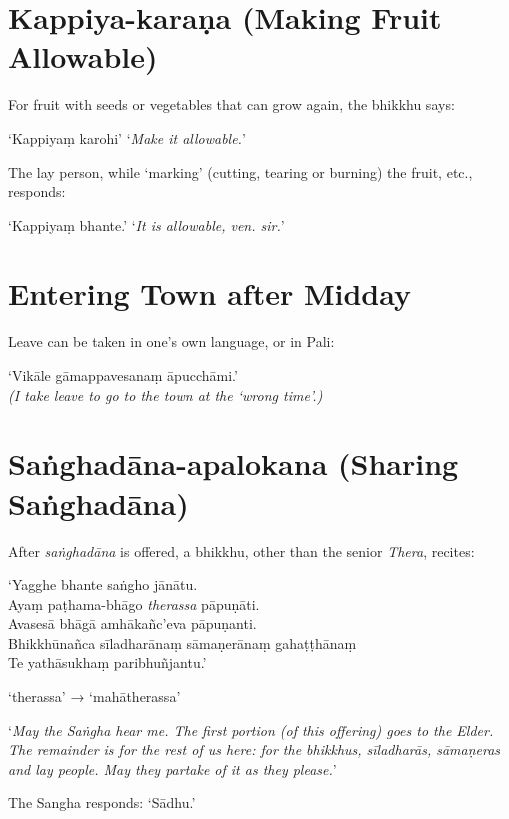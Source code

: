 \section{Kappiya-karaṇa (Making Fruit Allowable)}

For fruit with seeds or vegetables that can grow again, the bhikkhu says:

‘Kappiyaṃ karohi’ ‘\emph{Make it allowable.}’

The lay person, while ‘marking’ (cutting, tearing or burning) the fruit, etc., responds:

‘Kappiyaṃ bhante.’ ‘\emph{It is allowable, ven. sir.}’ 

\section{Entering Town after Midday}

Leave can be taken in one's own language, or in Pali:

‘Vikāle gāmappavesanaṃ āpucchāmi.’\\
\emph{(I take leave to go to the town at the ‘wrong time’.)} 

\section{Saṅghadāna-apalokana (Sharing Saṅghadāna)}

\ifreferenceedition
\enlargethispage{\baselineskip}
\fi

After \emph{saṅghadāna} is offered, a bhikkhu, other than the senior
\emph{Thera}, recites:

\vspace*{\parskip}

‘Yagghe bhante saṅgho jānātu.\\
Ayaṃ paṭhama-bhāgo \emph{therassa} pāpuṇāti.\\
Avasesā bhāgā amhākañc’eva pāpuṇanti.\\
Bhikkhūnañca sīladharānaṃ sāmaṇerānaṃ gahaṭṭhānaṃ\\
Te yathāsukhaṃ paribhuñjantu.’

‘therassa’ → ‘mahātherassa’

‘\emph{May the Saṅgha hear me. The first portion (of this offering) goes to the
  Elder. The remainder is for the rest of us here: for the bhikkhus, sīladharās,
  sāmaṇeras and lay people. May they partake of it as they please.}’

The Sangha responds: ‘Sādhu.’ 

